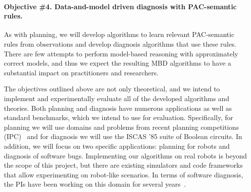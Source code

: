 \documentclass[12pt]{article}
\begin{document}
\vspace{-0.35cm}
\paragraph{Objective \#4. Data-and-model driven diagnosis with PAC-semantic rules.} 
As with planning, we will develop algorithms to learn 
relevant PAC-semantic rules from observations and develop diagnosis algorithms that use these rules. There are few attempts to perform model-based reasoning with approximately correct models, and thus we expect the resulting MBD algorithms to have a substantial impact on practitioners and researchers.  







The objectives outlined above are not only theoretical, and we intend to implement and experimentally evaluate all of the developed algorithms and theories. 
Both planning and diagnosis have numerous applications as well as standard benchmarks, which we intend to use for evaluation. Specifically, for planning we will use domains and problems from recent planning competitions (IPC)~\cite{vallati20152014} and for diagnosis we will use the ISCAS '85 suite of Boolean circuits. In addition, we will focus on two specific applications: %
planning for robots and diagnosis of software bugs. 
Implementing our algorithms on real robots is beyond the scope of this project, but there are existing simulators and code frameworks that allow experimenting on robot-like scenarios. In terms of software diagnosis, the PIs have been working on this domain for several years~\cite{Zamir2014UsingMD,elmishali2016dataAugmented,juba2015ndss}. 
\end{document}
